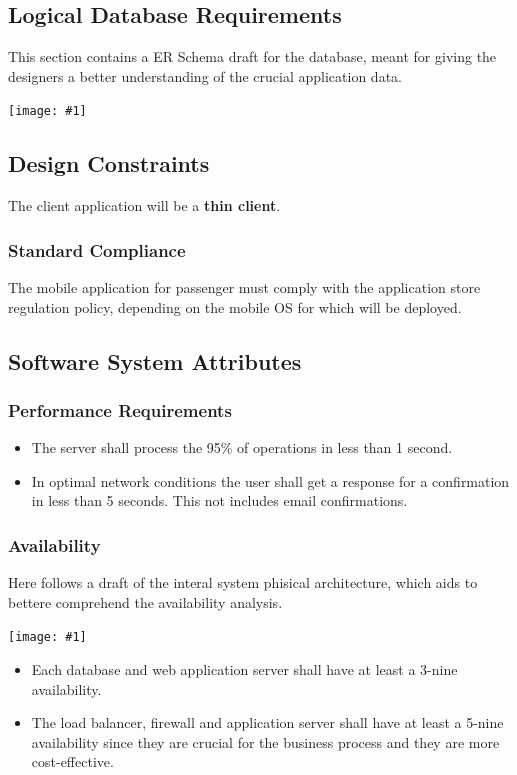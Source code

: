 \documentclass[11pt, a4paper,titlepage]{article}
\newcommand{\image}[1]{
	\begin{center}
		\noindent \texttt{[image: \#1]}
	\end{center}
	}
\begin{document}
\subsection{Logical Database Requirements}
	This section contains a ER Schema draft for the database, meant for giving the designers a better understanding of the crucial application data.
	\image{schema_database.png}
\subsection{Design Constraints}
 The client application will be a \textbf{thin client}.
\subsubsection{Standard Compliance}
	The mobile application for passenger must comply with the application store regulation policy, depending on the mobile OS for which will be deployed.
\subsection{Software System Attributes}
\subsubsection{Performance Requirements} %
\begin{itemize}
	\item The server shall process the 95\% of operations in less than 1 second.
	\item In optimal network conditions the user shall get a response for a confirmation in less than 5 seconds. This not includes email confirmations. 
\end{itemize}
\subsubsection{Availability}
 Here follows a draft of the interal system phisical architecture, which aids to bettere comprehend the availability analysis.
  \image{schema_availability.png}
 \begin{itemize}
 \item Each database and web application server shall have at least a 3-nine availability.
 \item The load balancer, firewall and application server shall have at least a 5-nine availability since they are crucial for the business process and they are more cost-effective.
\end{itemize}
\end{document}
